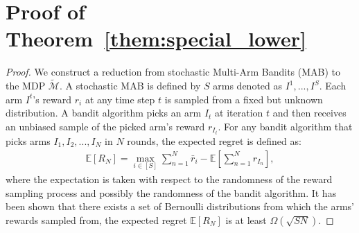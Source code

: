 \documentclass{article}
\begin{document}
\section{Proof of Theorem~\ref{them:special_lower}}
\label{sec:special_lower}
\begin{proof}
We construct a reduction from stochastic Multi-Arm Bandits (MAB) to the MDP $\tilde{\mathcal{M}}$. A stochastic MAB is defined by $S$ arms denoted as $I^1, ..., I^S$. Each arm $I^t$'s reward $r_{i}$ at any time step $t$ is sampled from a fixed but unknown distribution. A bandit algorithm picks an arm $I_t$ at  iteration $t$ and then receives an unbiased sample of the picked arm's reward $r_{I_t}$. For any bandit algorithm that picks arms $I_1, I_2,...,I_N$ in $N$ rounds, the expected regret is defined as:
\begin{align}
\mathbb{E}[R_N] = \max_{i\in [S]}\sum_{n=1}^N \bar{r}_{i} - \mathbb{E}[  \sum_{n=1}^N r_{I_n}],
\end{align} where the expectation is taken with respect to the randomness of the reward sampling process and possibly the randomness of the bandit algorithm. It has been shown that there exists a set of Bernoulli distributions from which the arms' rewards sampled from, the expected regret $\mathbb{E}[R_N]$ is at least $\Omega(\sqrt{S N})$. 


\end{proof}
\end{document}
